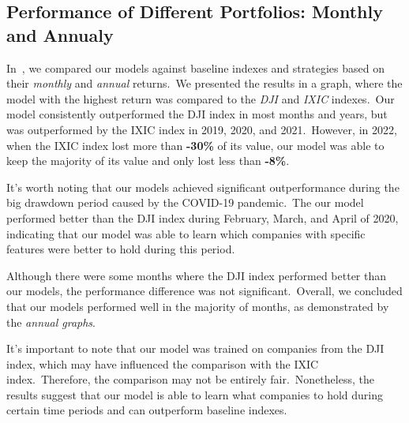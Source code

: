 \documentclass[../xlapes02]{subfiles}
\begin{document}
    \subsection{Performance of Different Portfolios: Monthly and Annualy}\label{subsec:monthly-and-annual-returns}
    In~, we compared our models against baseline indexes and strategies based on their \emph{monthly} and \emph{annual} returns.\ We presented the results in a graph, where the model with the highest return was compared to the \emph{DJI} and \emph{IXIC} indexes.\ Our model consistently outperformed the DJI index in most months and years, but was outperformed by the IXIC index in 2019, 2020, and 2021.\ However, in 2022, when the IXIC index lost more than \textbf{-30\%} of its value, our model was able to keep the majority of its value and only lost less than \textbf{-8\%}.

    It's worth noting that our models achieved significant outperformance during the big drawdown period caused by the COVID-19 pandemic.\ The our model performed better than the DJI index during February, March, and April of 2020, indicating that our model was able to learn which companies with specific features were better to hold during this period.

    Although there were some months where the DJI index performed better than our models, the performance difference was not significant.\ Overall, we concluded that our models performed well in the majority of months, as demonstrated by the \emph{annual graphs}.

    It's important to note that our model was trained on companies from the DJI index, which may have influenced the comparison with the IXIC index.\ Therefore, the comparison may not be entirely fair.\ Nonetheless, the results suggest that our model is able to learn what companies to hold during certain time periods and can outperform baseline indexes.
\end{document}
